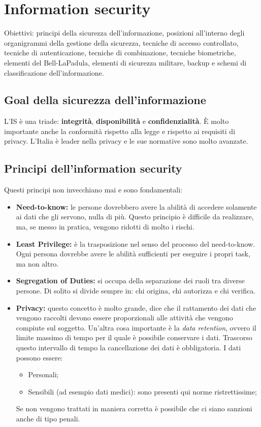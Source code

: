 \chapter{Information security}

Obiettivi: principi della sicurezza dell'informazione, posizioni all'interno 
degli organigrammi della gestione della sicurezza, tecniche di accesso 
controllato, tecniche di autenticazione, tecniche di combinazione, 
tecniche biometriche, elementi del Bell-LaPadula, elementi di sicurezza 
militare, backup e schemi di classificazione dell'informazione.


\section{Goal della sicurezza dell'informazione}

L'IS è una triade: \textbf{integrità}, \textbf{disponibilità} e 
\textbf{confidenzialità}. È molto importante anche la conformità rispetto alla 
legge e rispetto ai requisiti di privacy. L'Italia è leader nella privacy e le 
sue normative sono molto avanzate.


\section{Principi dell'information security}

Questi principi non invecchiano mai e sono fondamentali:
\begin{itemize}
  \item \textbf{Need-to-know:} le persone dovrebbero avere la abilità di 
  accedere solamente ai dati che gli servono, nulla di più. Questo principio è 
  difficile da realizzare, ma, se messo in pratica, vengono ridotti di molto i 
  rischi.
  \item \textbf{Least Privilege:} è la trasposizione nel senso del processo 
  del need-to-know. Ogni persona dovrebbe avere le abilità sufficienti per 
  eseguire i propri task, ma non altro.
  \item \textbf{Segregation of Duties:} si occupa della separazione dei ruoli 
  tra diverse persone. Di solito si divide sempre in: chi origina, chi 
  autorizza e chi verifica.
  \item \textbf{Privacy:} questo concetto è molto grande, dice che il 
  rattamento dei dati che vengono raccolti devono essere proporzionali alle 
  attività che vengono compiute sul soggetto. Un'altra cosa importante è la 
  \textit{data retention}, ovvero il limite massimo di tempo per il quale è 
  possibile conservare i dati. Trascorso questo intervallo di tempo la 
  cancellazione dei dati è obbligatoria. I dati possono essere:
  \begin{itemize}
    \item Personali;
    \item Sensibili (ad esempio dati medici): sono presenti qui norme
    ristrettissime;
  \end{itemize}
  Se non vengono trattati in maniera corretta è possibile che ci siano sanzioni
  anche di tipo penali.
\end{itemize}

